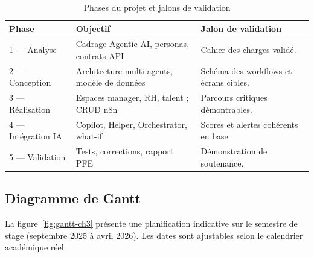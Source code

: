 \begin{table}[htbp]
\centering
\caption{Phases du projet et jalons de validation}
\label{tab:phases-ch3}
\begin{tabular}{@{}p{2.2cm}p{4.2cm}p{6.6cm}@{}}
\toprule
\textbf{Phase} & \textbf{Objectif} & \textbf{Jalon de validation} \\
\midrule
1 — Analyse & Cadrage Agentic AI, personas, contrats API & Cahier des charges validé. \\
2 — Conception & Architecture multi-agents, modèle de données & Schéma des workflows et écrans cibles. \\
3 — Réalisation & Espaces manager, RH, talent ; CRUD n8n & Parcours critiques démontrables. \\
4 — Intégration IA & Copilot, Helper, Orchestrator, what-if & Scores et alertes cohérents en base. \\
5 — Validation & Tests, corrections, rapport PFE & Démonstration de soutenance. \\
\bottomrule
\end{tabular}
\end{table}

\subsection{Diagramme de Gantt}

La figure~\ref{fig:gantt-ch3} présente une planification indicative sur le semestre de stage (septembre 2025 à avril 2026). Les dates sont ajustables selon le calendrier académique réel.

